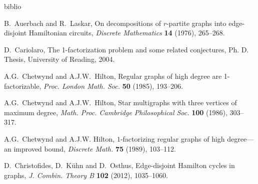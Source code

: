 

\begin{thebibliography}{biblio}



 B.~Auerbach and R.~Laskar,
On decompositions of $r$-partite graphs into edge-disjoint Hamiltonian circuits,
\emph{Discrete Mathematics} {\bf 14} (1976), 265--268.

 D.~Cariolaro,
The 1-factorization problem and some related conjectures, Ph. D. Thesis, University of Reading, 2004.

 A.G.~Chetwynd and A.J.W.~Hilton, 
Regular graphs of high degree are 1-factorizable, 
\emph{Proc. London Math. Soc.} {\bf 50} (1985), 193--206.

 A.G.~Chetwynd and  A.J.W.~Hilton,  
Star multigraphs with three vertices of maximum degree, 
\emph{Math. Proc. Cambridge Philosophical Soc.}  {\bf 100} (1986), 303--317.

 A.G.~Chetwynd  and A.J.W. Hilton, 
$1$-factorizing regular graphs of high degree---an improved bound, 
\emph{Discrete Math.} {\bf 75} (1989), 103--112.

 D.~Christofides, D.~K\"uhn and D.~Osthus, Edge-disjoint
Hamilton cycles in graphs, \emph{J. Combin. Theory B} \textbf{102} (2012), 1035--1060.







\end{thebibliography}
